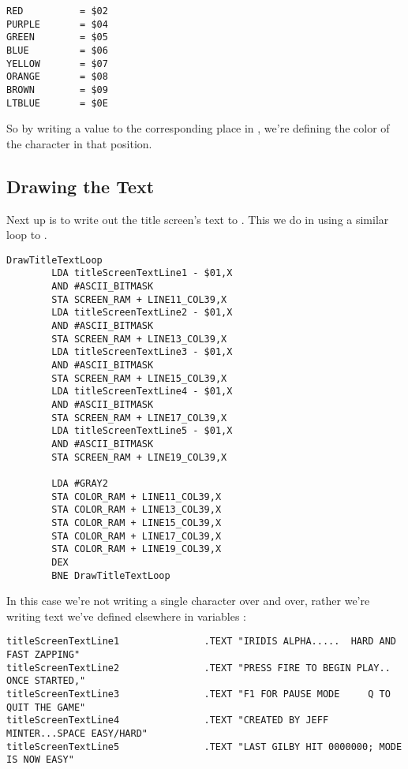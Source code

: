 \begin{lstlisting}[caption=In \icode{DrawStripesBehindTitle}]
RED          = $02
PURPLE       = $04
GREEN        = $05
BLUE         = $06
YELLOW       = $07
ORANGE       = $08
BROWN        = $09
LTBLUE       = $0E
\end{lstlisting}

So by writing a value to the corresponding place in , we're defining the color of the character
in that position.



\subsection{Drawing the Text}

Next up is to write out the title screen's text to . This we do in 
using a similar loop to . 

\begin{lstlisting}[caption=In \icode{DrawTitleScreenText}]
DrawTitleTextLoop   
        LDA titleScreenTextLine1 - $01,X
        AND #ASCII_BITMASK
        STA SCREEN_RAM + LINE11_COL39,X
        LDA titleScreenTextLine2 - $01,X
        AND #ASCII_BITMASK
        STA SCREEN_RAM + LINE13_COL39,X
        LDA titleScreenTextLine3 - $01,X
        AND #ASCII_BITMASK
        STA SCREEN_RAM + LINE15_COL39,X
        LDA titleScreenTextLine4 - $01,X
        AND #ASCII_BITMASK
        STA SCREEN_RAM + LINE17_COL39,X
        LDA titleScreenTextLine5 - $01,X
        AND #ASCII_BITMASK
        STA SCREEN_RAM + LINE19_COL39,X

        LDA #GRAY2
        STA COLOR_RAM + LINE11_COL39,X
        STA COLOR_RAM + LINE13_COL39,X
        STA COLOR_RAM + LINE15_COL39,X
        STA COLOR_RAM + LINE17_COL39,X
        STA COLOR_RAM + LINE19_COL39,X
        DEX
        BNE DrawTitleTextLoop
\end{lstlisting}

In this case we're not writing a single character over and over, rather we're writing text we've defined elsewhere
in variables :

\begin{lstlisting}[basicstyle=\tiny,caption=In \icode{DrawTitleScreenText}]
titleScreenTextLine1               .TEXT "IRIDIS ALPHA.....  HARD AND FAST ZAPPING"
titleScreenTextLine2               .TEXT "PRESS FIRE TO BEGIN PLAY.. ONCE STARTED,"
titleScreenTextLine3               .TEXT "F1 FOR PAUSE MODE     Q TO QUIT THE GAME"
titleScreenTextLine4               .TEXT "CREATED BY JEFF MINTER...SPACE EASY/HARD"
titleScreenTextLine5               .TEXT "LAST GILBY HIT 0000000; MODE IS NOW EASY"
\end{lstlisting}

